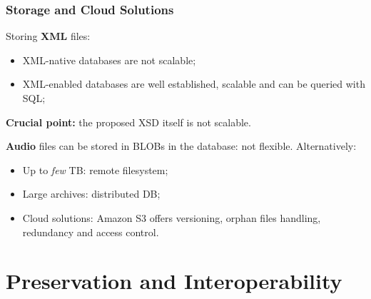 \documentclass{beamer}
\newcommand\rb[1]{\textcolor{ThemeRed}{\textbf{#1}}}
\begin{document}
  \begin{frame}
    \frametitle{Storage and Cloud Solutions}

    Storing \rb{XML} files:

    \vspace{0.5em}

    \begin{itemize}
      \item XML-native databases are not scalable;
      \item XML-enabled databases are well established, scalable and can be queried with SQL;
    \end{itemize}

    \vspace{0.5em}

    \rb{Crucial point:} the proposed XSD itself is not scalable.

    \vspace{1em}

    \rb{Audio} files can be stored in BLOBs in the database: not flexible. Alternatively:

    \vspace{0.5em}

    \begin{itemize}
      \item Up to \textit{few} TB: remote filesystem;
      \item Large archives: distributed DB;
      \item Cloud solutions: Amazon S3 offers versioning, orphan files handling, redundancy and access control.
    \end{itemize}

  \end{frame}



\section{Preservation and Interoperability}
\end{document}
